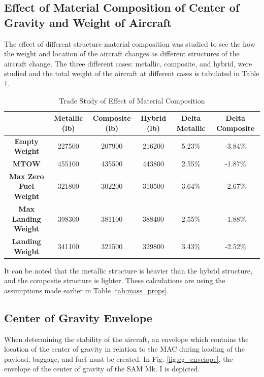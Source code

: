 \subsection{Effect of Material Composition of Center of Gravity and Weight of Aircraft}
The effect of different structure material composition was studied to see the how the weight and location of the aircraft changes as different structures of the aircraft change. The three different cases: metallic, composite, and hybrid, were studied and the total weight of the aircraft at different cases is tabulated in Table \ref{tab:mas_study}.

\begin{table}[!h]
\caption{Trade Study of Effect of Material Composition}
\label{tab:mas_study}
\begin{tabular}{|c||c|c|c|c|c|}
\hline
 & \textbf{Metallic (lb)} & \textbf{Composite (lb)} & \textbf{Hybrid (lb)} & \textbf{Delta Metallic} & \textbf{Delta Composite} \\ \hline \hline
\textbf{Empty Weight} & 227500 & 207900 & 216200 & 5.23\% & -3.84\% \\ \hline
\textbf{MTOW} & 455100 & 435500 & 443800 & 2.55\% & -1.87\% \\ \hline
\textbf{Max Zero Fuel Weight} & 321800 & 302200 & 310500 & 3.64\% & -2.67\% \\ \hline
\textbf{Max Landing Weight} & 398300 & 381100 & 388400 & 2.55\% & -1.88\% \\ \hline
\textbf{Landing Weight} & 341100 & 321500 & 329800 & 3.43\% & -2.52\% \\ \hline
\end{tabular}
\end{table}

It can be noted that the metallic structure is heavier than the hybrid structure, and the composite structure is lighter. These calculations are using the assumptions made earlier in Table \ref{tab:mass_props}.

\subsection{Center of Gravity Envelope}
When determining the stability of the aircraft, an envelope which contains the location of the center of gravity in relation to the MAC during loading of the payload, baggage, and fuel must be created. In Fig. \ref{fig:cg_envelope}, the envelope of the center of gravity of the SAM Mk. I is depicted.

